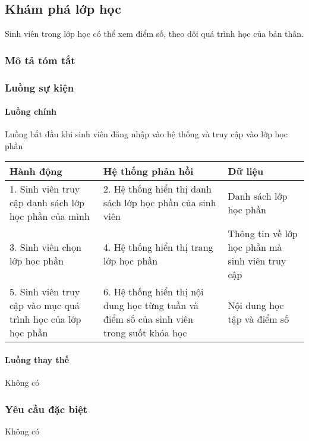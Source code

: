 \documentclass[./../main_file.tex]{subfiles}
\begin{document}
\subsection{Khám phá lớp học}
Sinh viên trong lớp học có thể xem điểm số, theo dõi quá trình học của bản thân.

\subsubsection{Mô tả tóm tắt}
\subsubsection{Luồng sự kiện}
\paragraph{Luồng chính}
 Luồng bắt đầu khi sinh viên đăng nhập vào hệ thống và truy cập vào lớp học phần
\begin{table}[H]
				\begin{tabular}{|p{.33\textwidth}|p{}|p{}|}
		\hline
		\textbf{Hành động}                                 & \textbf{Hệ thống phản hồi}                             & \textbf{Dữ liệu}                                \\ \hline
		1. Sinh viên truy cập danh sách lớp học phần của mình & 2. Hệ thống hiển thị danh sách lớp học phần của sinh viên & Danh sách lớp học phần                          \\ \hline
		3. Sinh viên chọn lớp học phần                        & 4. Hệ thống hiển thị trang lớp học phần                & Thông tin về lớp học phần mà sinh viên truy cập \\ \hline
		5. Sinh viên truy cập vào mục quá trình học của lớp học phần &
		6. Hệ thống hiển thị nội dung học từng tuần và điểm số của sinh viên trong suốt khóa học &
		Nội dung học tập và điểm số \\ \hline
	\end{tabular}
\end{table}
\paragraph{Luồng thay thế}
Không có

\subsubsection{Yêu cầu đặc biệt}
Không có
\end{document}
